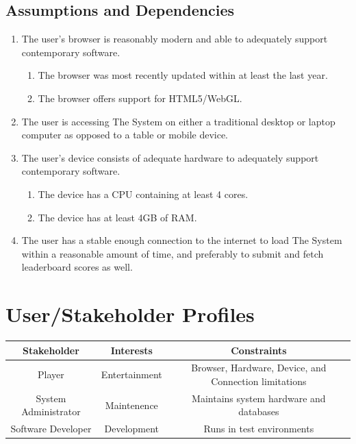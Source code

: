 \documentclass[12pt]{report}
\newenvironment{reqlist}{
	\renewcommand{\labelenumi}{\tab\thesubsection.\arabic{enumi}}
	\renewcommand{\labelenumii}{\thesubsection.\arabic{enumi}.\arabic{enumii}}
	\begin{enumerate}[itemsep = 1pt, parsep = 0pt, leftmargin = *]
}{\end{enumerate}}
\begin{document}
	\subsection{Assumptions and Dependencies}
		\begin{reqlist}
			\item The user's browser is reasonably modern and able to adequately support contemporary software.
			\begin{reqlist}
				\item The browser was most recently updated within at least the last year.
				\item The browser offers support for HTML5/WebGL.
			\end{reqlist}
			\item The user is accessing The System on either a traditional desktop or laptop computer as opposed to a table or mobile device.
			\item The user's device consists of adequate hardware to adequately support contemporary software.
			\begin{reqlist}
				\item The device has a CPU containing at least 4 cores.
				\item The device has at least 4GB of RAM.
			\end{reqlist}
			\item The user has a stable enough connection to the internet to load The System within a reasonable amount of time, and preferably to submit and fetch leaderboard scores as well.
		\end{reqlist}

\section{User/Stakeholder Profiles}
\begin{center}
	\begin{tabular}{|c|c|c|} \hline
		\textbf{Stakeholder} & \textbf{Interests} & \textbf{Constraints} \\ \hline
		Player & Entertainment & Browser, Hardware, Device, and Connection limitations \\ \hline
		System Administrator & Maintenence & Maintains system hardware and databases \\ \hline
		Software Developer & Development & Runs in test environments \\ \hline
	\end{tabular}
\end{center}
\end{document}
